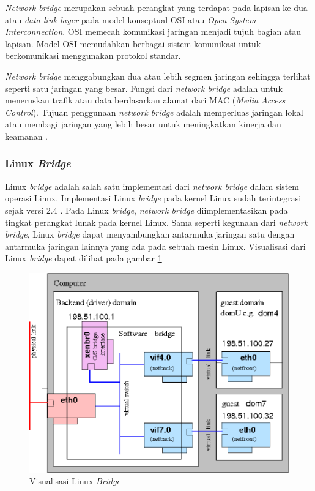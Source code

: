 \emph{Network bridge} merupakan sebuah perangkat yang terdapat pada lapisan ke-dua atau \emph{data link layer} pada
model konseptual OSI atau \emph{Open System Interconnection}. OSI memecah komunikasi jaringan
menjadi tujuh bagian atau lapisan. Model OSI memudahkan berbagai sistem komunikasi
untuk berkomunikasi menggunakan protokol standar.

\emph{Network bridge} menggabungkan dua atau lebih segmen jaringan sehingga terlihat
seperti satu jaringan yang besar. Fungsi dari \emph{network bridge} adalah untuk meneruskan
trafik atau data berdasarkan alamat dari MAC (\emph{Media Access Control}). Tujuan
penggunaan \emph{network bridge} adalah memperluas jaringan lokal atau
membagi jaringan yang lebih besar untuk meningkatkan kinerja dan keamanan \parencite{network-bridge}.

\subsubsection{Linux \emph{Bridge}}

Linux \emph{bridge} adalah salah satu implementasi dari \emph{network bridge} dalam sistem
operasi Linux. Implementasi Linux \emph{bridge} pada kernel Linux sudah
terintegrasi sejak versi 2.4 \parencite{linux-foundation-bridge-website}.
Pada Linux \emph{bridge}, \emph{network bridge} diimplementasikan pada tingkat
perangkat lunak pada kernel Linux. Sama seperti kegunaan dari \emph{network bridge},
Linux \emph{bridge} dapat menyambungkan antarmuka jaringan satu dengan antarmuka jaringan
lainnya yang ada pada sebuah mesin Linux. Visualisasi dari Linux \emph{bridge}
dapat dilihat pada gambar \ref{fig:linux-bridge}

\begin{figure}[H]
  \centering
  \includegraphics[scale=0.3]{gambar/linux-bridge.png}
  \caption{Visualisasi Linux \emph{Bridge} \parencite{Singh861571}}
  \label{fig:linux-bridge}
\end{figure}

